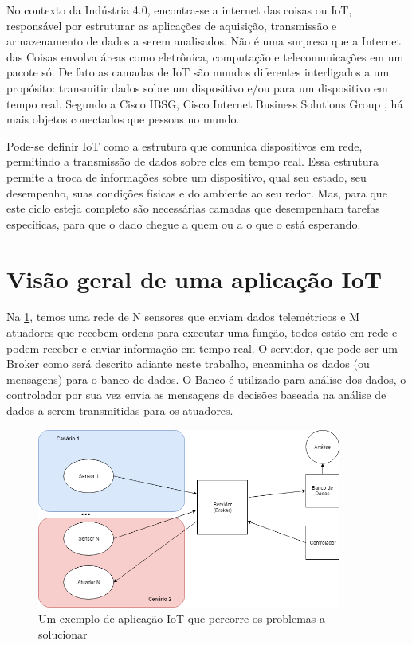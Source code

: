 No contexto da Indústria 4.0, encontra-se a internet das coisas ou IoT, responsável por estruturar as aplicações de aquisição, transmissão e armazenamento de dados a serem analisados. Não é uma surpresa que a Internet das Coisas envolva áreas como eletrônica, computação e telecomunicações em um pacote só. De fato as camadas de IoT são mundos diferentes interligados a um propósito: transmitir dados sobre um dispositivo e/ou para um dispositivo em tempo real. Segundo a Cisco IBSG, Cisco Internet Business Solutions Group \cite{cisco:ibsg}, há mais objetos conectados que pessoas no mundo.

Pode-se definir IoT como a estrutura que comunica dispositivos em rede, permitindo a transmissão de dados sobre eles em tempo real. Essa estrutura permite a troca de informações sobre um dispositivo, qual seu estado, seu desempenho, suas condições físicas e do ambiente ao seu redor. Mas, para que este ciclo esteja completo são necessárias camadas que desempenham tarefas específicas, para que o dado chegue a quem ou a o que o está esperando.

\section{Visão geral de uma aplicação IoT}
\label{section:overview}

Na \ref{fig:1.1.0/iot_app}, temos uma rede de N sensores que enviam dados telemétricos e M atuadores que recebem ordens para executar uma função, todos estão em rede e podem receber e enviar informação em tempo real. O servidor, que pode ser um Broker como será descrito adiante neste trabalho, encaminha os dados (ou mensagens) para o banco de dados. O Banco é utilizado para análise dos dados, o controlador por sua vez envia as mensagens de decisões baseada na análise de dados a serem transmitidas para os atuadores.

\begin{figure}[h!]
\centering
\includegraphics[width=10cm]{./02_Capitulos/02_Cap1/figures/iot_app}
\caption{Um exemplo de aplicação IoT que percorre os problemas a solucionar}
\label{fig:1.1.0/iot_app}
\end{figure}

